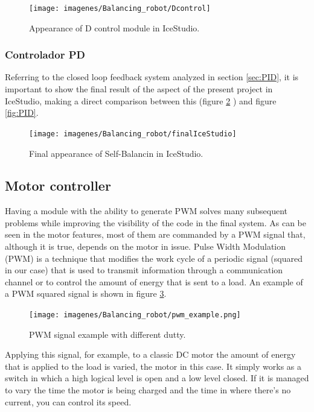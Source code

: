 \begin{figure}[H]
	\center
	\texttt{[image: imagenes/Balancing\_robot/Dcontrol]}
	\caption{Appearance of D control module in IceStudio.}
	\label{fig:Dcontrol}
\end{figure}

\subsubsection{Controlador PD}

Referring to the closed loop feedback system analyzed in section \ref{sec:PID}, it is important to show the final result of the aspect of the present project in IceStudio, making a direct comparison between this (figure \ref{fig:finalIceStudio} ) and figure \ref{fig:PID}.
\newpage
\begin{figure}[H]
	\center
	\texttt{[image: imagenes/Balancing\_robot/finalIceStudio]}
	\caption{Final appearance of Self-Balancin in IceStudio.}
	\label{fig:finalIceStudio}
\end{figure}

\subsection{Motor controller} \label{sec:driver_motores}
Having a module with the ability to generate PWM solves many subsequent problems while improving the visibility of the code in the final system. As can be seen in the motor features, most of them are commanded by a PWM signal that, although it is true, depends on the motor in issue. \newline
Pulse Width Modulation (PWM) is a technique that modifies the work cycle of a periodic signal (squared in our case) that is used to transmit information through a communication channel or to control the amount of energy that is sent to a load. An example of a PWM squared signal is shown in figure \ref{fig:pwm_example}.

\begin{figure}[H]
	\center
	\texttt{[image: imagenes/Balancing\_robot/pwm\_example.png]}
	\caption{PWM signal example with different dutty.}
	\label{fig:pwm_example}
\end{figure}


Applying this signal, for example, to a classic DC motor the amount of energy that is applied to the load is varied, the motor in this case. It simply works as a switch in which a high logical level is open and a low level closed. If it is managed to vary the time the motor is being charged and the time in where there’s no current, you can control its speed. \newline

